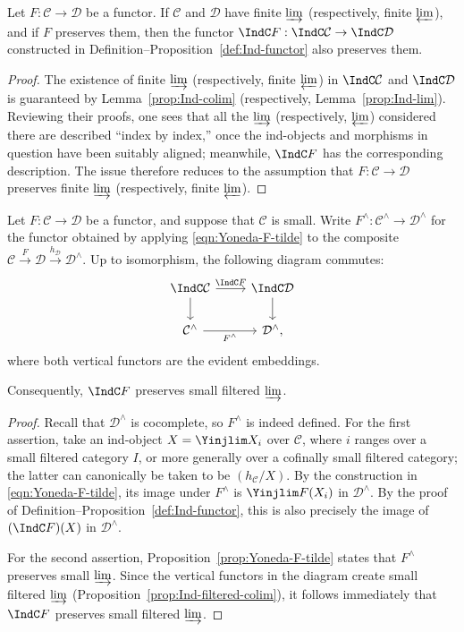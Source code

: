 \begin{lemma}\label{prop:Ind-hat-functor-prep}
	Let $F:\mathcal{C}\to\mathcal{D}$ be a functor. If $\mathcal{C}$ and $\mathcal{D}$ have finite $\varinjlim$ (respectively, finite $\varprojlim$), and if $F$ preserves them, then the functor $\IndC F:\IndC\mathcal{C}\to\IndC\mathcal{D}$ constructed in Definition--Proposition~\ref{def:Ind-functor} also preserves them.
\end{lemma}
\begin{proof}
	The existence of finite $\varinjlim$ (respectively, finite $\varprojlim$) in $\IndC\mathcal{C}$ and $\IndC\mathcal{D}$ is guaranteed by Lemma~\ref{prop:Ind-colim} (respectively, Lemma~\ref{prop:Ind-lim}). Reviewing their proofs, one sees that all the $\varinjlim$ (respectively, $\varprojlim$) considered there are described ``index by index,'' once the ind-objects and morphisms in question have been suitably aligned; meanwhile, $\IndC F$ has the corresponding description. The issue therefore reduces to the assumption that $F:\mathcal{C}\to\mathcal{D}$ preserves finite $\varinjlim$ (respectively, finite $\varprojlim$).
\end{proof}

\begin{lemma}\label{prop:IndF-vs-Yoneda}
	Let $F:\mathcal{C}\to\mathcal{D}$ be a functor, and suppose that $\mathcal{C}$ is small. Write $F^\wedge:\mathcal{C}^\wedge\to\mathcal{D}^\wedge$ for the functor obtained by applying \eqref{eqn:Yoneda-F-tilde} to the composite $\mathcal{C}\xrightarrow{F}\mathcal{D}\xrightarrow{h_{\mathcal{D}}}\mathcal{D}^\wedge$. Up to isomorphism, the following diagram commutes:
	\[\begin{tikzcd}
		\IndC\mathcal{C} \arrow[r, "{\IndC F}"] \arrow[d] & \IndC\mathcal{D} \arrow[d] \\
		\mathcal{C}^\wedge \arrow[r, "{F^\wedge}"'] & \mathcal{D}^\wedge ,
	\end{tikzcd}\]
	where both vertical functors are the evident embeddings.

	Consequently, $\IndC F$ preserves small filtered $\varinjlim$.
\end{lemma}
\begin{proof}
	Recall that $\mathcal{D}^\wedge$ is cocomplete, so $F^\wedge$ is indeed defined. For the first assertion, take an ind-object $X=\Yinjlim X_i$ over $\mathcal{C}$, where $i$ ranges over a small filtered category $I$, or more generally over a cofinally small filtered category; the latter can canonically be taken to be $(h_{\mathcal{C}}/X)$. By the construction in \eqref{eqn:Yoneda-F-tilde}, its image under $F^\wedge$ is $\Yinjlim F(X_i)$ in $\mathcal{D}^\wedge$. By the proof of Definition--Proposition~\ref{def:Ind-functor}, this is also precisely the image of $(\IndC F)(X)$ in $\mathcal{D}^\wedge$.

	For the second assertion, Proposition~\ref{prop:Yoneda-F-tilde} states that $F^\wedge$ preserves small $\varinjlim$. Since the vertical functors in the diagram create small filtered $\varinjlim$ (Proposition~\ref{prop:Ind-filtered-colim}), it follows immediately that $\IndC F$ preserves small filtered $\varinjlim$.
\end{proof}

